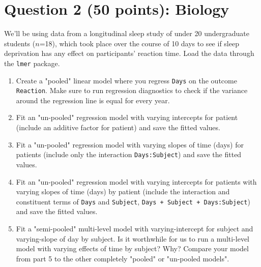 \documentclass[12pt,letterpaper]{article}
\begin{document}
\section*{Question 2 (50 points): Biology}
\noindent We'll be using data from a longitudinal sleep study of under 20 undergraduate students ($n$=18), which took place over the course of 10 days to see if sleep deprivation has any effect on participants' reaction time. Load the data through the \texttt{lmer} package.

\begin{enumerate}
	\item
	Create a "pooled" linear model where you regress \texttt{Days} on the outcome \texttt{Reaction}. Make sure to run regression diagnostics to check if the variance around the regression line is equal for every year.
	
	\item Fit an "un-pooled" regression model with varying intercepts for patient (include an additive factor for patient) and save the fitted values.
	
	\item Fit a "un-pooled" regression model with varying slopes of time (days) for patients (include only the interaction \texttt{Days:Subject}) and save the fitted values.
	
	\item Fit an "un-pooled" regression model with varying intercepts for patients with varying slopes of time (days) by patient (include the interaction and constituent terms of \texttt{Days} and \texttt{Subject}, \texttt{Days + Subject + Days:Subject}) and save the fitted values.
	
	\item Fit a "semi-pooled" multi-level model with varying-intercept for subject and varying-slope of day by subject. Is it worthwhile for us to run a multi-level model with varying effects of time by subject? Why? Compare your model from part 5 to the other completely "pooled" or "un-pooled models".

\end{enumerate}
\end{document}
